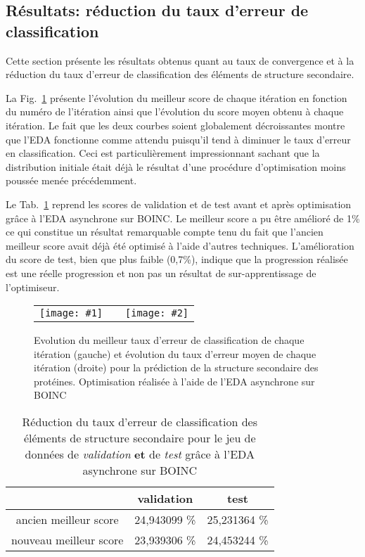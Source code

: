 \documentclass[a4paper, 12pt]{report}
\newcommand{\twocurves}[2]{
 \begin{tabular}{lcr}
  \hspace{-30pt} 
  \texttt{[image: \#1]} 
  & \hspace{-65pt} & 
  \texttt{[image: \#2]} \\
 \end{tabular}
 \vspace{-10pt}
}
\begin{document}
\subsection{Résultats: réduction du taux d'erreur de classification}
Cette section présente les résultats obtenus quant au taux de convergence et à la réduction du taux d'erreur de classification des éléments de structure secondaire.

La Fig.~\ref{scoreboinc} présente l'évolution du meilleur score de chaque itération en fonction du numéro de l'itération ainsi que l'évolution du score moyen obtenu à chaque itération. Le fait que les deux courbes soient globalement décroissantes montre que l'EDA fonctionne comme attendu puisqu'il tend à diminuer le taux d'erreur en classification. Ceci est particulièrement impressionnant sachant que la distribution initiale était déjà le résultat d'une procédure d'optimisation moins poussée menée précédemment.  %

Le Tab.~\ref{tabimprove} reprend les scores de validation et de test avant et après optimisation grâce à l'EDA asynchrone sur \textsc{BOINC}. Le meilleur score a pu être amélioré de 1\% ce qui constitue un résultat remarquable compte tenu du fait que l'ancien meilleur score avait déjà été optimisé à l'aide d'autres techniques. L'amélioration du score de test, bien que plus faible (0,7\%), indique que la progression réalisée est une réelle progression et non pas un résultat de sur-apprentissage de l'optimiseur. 

\begin{figure}[!tb]
\twocurves{./data/asynceda1.pdf}{./data/scoresMean.pdf}
\caption{Evolution du meilleur taux d'erreur de classification de chaque itération (gauche) et évolution du taux d'erreur moyen de chaque itération (droite) pour la prédiction de la structure secondaire des protéines. Optimisation réalisée à l'aide de l'EDA asynchrone sur \textsc{BOINC}}
\label{scoreboinc}
\end{figure}

\begin{table}[!tb]
\caption{Réduction du taux d'erreur de classification des éléments de structure secondaire pour le jeu de données de \textit{validation} \textbf{et} de \textit{test} grâce à l'EDA asynchrone sur \textsc{BOINC}}
\begin{center}
\begin{tabular}{|c|c|c|}
\hline
 & validation & test\\
\hline
ancien meilleur score & 24,943099 \% & 25,231364 \%\\
nouveau meilleur score & 23,939306 \% & 24,453244 \%\\
\hline
\end{tabular}
\end{center}
\label{tabimprove}
\end{table}%
\newpage
\end{document}
